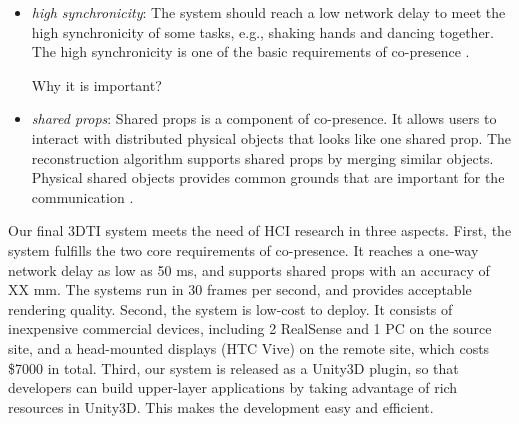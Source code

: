
\begin{itemize}
 \item \emph{high synchronicity}: The system should reach a low network delay to meet the high synchronicity of some tasks, e.g., shaking hands and dancing together. The high synchronicity is one of the basic requirements of co-presence \cite{kraut2003visual}.
 
 Why it is important?
 \item \emph{shared props}: Shared props is a component of co-presence. It allows users to interact with distributed physical objects that looks like one shared prop. The reconstruction algorithm supports shared props by merging similar objects. Physical shared objects provides common grounds that are important for the communication \cite{luff1998mobility, kraut2003visual}.
\end{itemize}

Our final 3DTI system meets the need of HCI research in three aspects. First, the system fulfills the two core requirements of co-presence. It reaches a one-way network delay as low as 50 ms, and supports shared props with an accuracy of XX mm. The systems run in 30 frames per second, and provides acceptable rendering quality. Second, the system is low-cost to deploy. It consists of inexpensive commercial devices, including 2 RealSense and 1 PC on the source site, and a head-mounted displays (HTC Vive) on the remote site, which costs \$7000 in total. Third, our system is released as a Unity3D plugin, so that developers can build upper-layer applications by taking advantage of rich resources in Unity3D. This makes the development easy and efficient.

